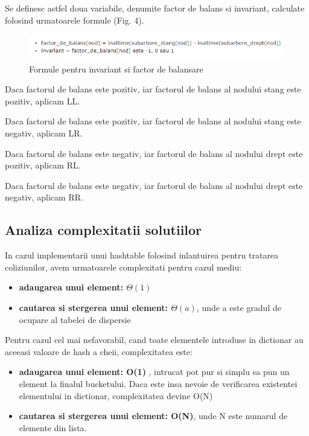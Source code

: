 \documentclass[runningheads]{llncs}
\begin{document}
Se definesc astfel doua variabile, denumite factor de balans si invariant, calculate folosind urmatoarele formule (Fig. 4). 
\vspace{\baselineskip}

\begin{figure}[ht!]
\centering
\includegraphics[width=120mm]{4.PNG}
\caption{Formule pentru invariant si factor de balansare \label{overflow}}
\end{figure}


Daca factorul de balans este pozitiv, iar factorul de balans al nodului stang este pozitiv, aplicam LL.

Daca factorul de balans este pozitiv, iar factorul de balans al nodului stang este negativ, aplicam LR.

Daca factorul de balans este negativ, iar factorul de balans al nodului drept este pozitiv, aplicam RL.

Daca factorul de balans este negativ, iar factorul de balans al nodului drept este negativ, aplicam RR.




\subsection{Analiza complexitatii solutiilor}
In cazul implementarii unui hashtable folosind inlantuirea pentru tratarea coliziunilor, avem urmatoarele complexitati pentru cazul mediu:

\begin{itemize}
\item \textbf{adaugarea unui element: \(\Theta(1)\) } 
\item \textbf{cautarea si stergerea unui element: \(\Theta(a)\)}, unde a este gradul de ocupare al tabelei de dispersie
\end{itemize}
\vspace{\baselineskip}

Pentru cazul cel mai nefavorabil, cand toate elementele introduse in dictionar au aceeasi valoare de hash a cheii, complexitatea este:

\begin{itemize}
\item \textbf{adaugarea unui element: O(1) }, intrucat pot pur si simplu sa pun un element la finalul bucketului. Daca este insa nevoie de verificarea existentei elementului in dictionar, complexitatea devine O(N)
\item \textbf{cautarea si stergerea unui element: O(N)}, unde N este numarul de elemente din lista.
\end{itemize}
\vspace{\baselineskip}
\end{document}
